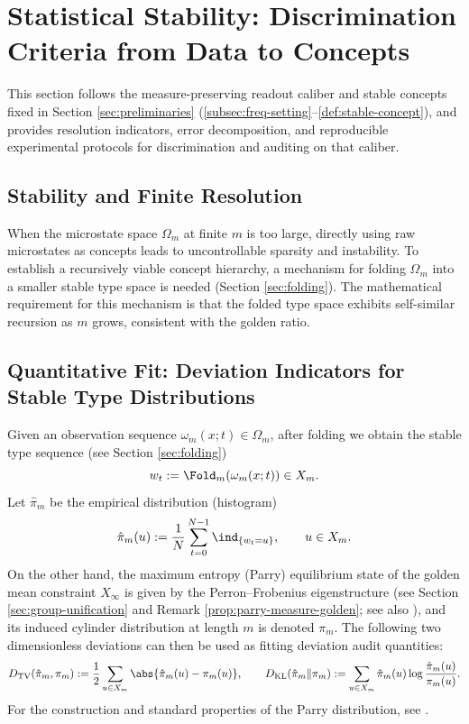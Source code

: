 \section{Statistical Stability: Discrimination Criteria from Data to Concepts}\label{sec:statistical-stability}

This section follows the measure-preserving readout caliber and stable concepts fixed in Section \ref{sec:preliminaries} (\ref{subsec:freq-setting}--\ref{def:stable-concept}), and provides resolution indicators, error decomposition, and reproducible experimental protocols for discrimination and auditing on that caliber.

\subsection{Stability and Finite Resolution}

When the microstate space $\Omega_m$ at finite $m$ is too large, directly using raw microstates as concepts leads to uncontrollable sparsity and instability. To establish a recursively viable concept hierarchy, a mechanism for folding $\Omega_m$ into a smaller stable type space is needed (Section \ref{sec:folding}). The mathematical requirement for this mechanism is that the folded type space exhibits self-similar recursion as $m$ grows, consistent with the golden ratio.

\subsection{Quantitative Fit: Deviation Indicators for Stable Type Distributions}\label{sec:quant-fit}
Given an observation sequence $\omega_m(x;t)\in\Omega_m$, after folding we obtain the stable type sequence (see Section \ref{sec:folding})
\[
w_t:=\Fold_m(\omega_m(x;t))\in X_m.
\]
Let $\hat{\pi}_m$ be the empirical distribution (histogram)
\[
\hat{\pi}_m(u):=\frac{1}{N}\sum_{t=0}^{N-1}\ind_{\{w_t=u\}},\qquad u\in X_m.
\]
On the other hand, the maximum entropy (Parry) equilibrium state of the golden mean constraint $X_\infty$ is given by the Perron--Frobenius eigenstructure (see Section \ref{sec:group-unification} and Remark \ref{prop:parry-measure-golden}; see also \cite{LindMarcus1995}), and its induced cylinder distribution at length $m$ is denoted $\pi_m$. The following two dimensionless deviations can then be used as fitting deviation audit quantities:
\[
D_{\mathrm{TV}}(\hat{\pi}_m,\pi_m):=\frac12\sum_{u\in X_m}\abs{\hat{\pi}_m(u)-\pi_m(u)},\qquad
D_{\mathrm{KL}}(\hat{\pi}_m\|\pi_m):=\sum_{u\in X_m}\hat{\pi}_m(u)\log\frac{\hat{\pi}_m(u)}{\pi_m(u)}.
\]
For the construction and standard properties of the Parry distribution, see \cite{LindMarcus1995}.

